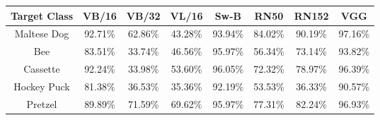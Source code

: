 \begin{table}[h!]
\begin{tabular}{|c|ccccccc|}
\hline
Target Class & VB/16 & VB/32 & VL/16 & Sw-B & RN50 & RN152 & VGG \\ \hline
Maltese Dog & 92.71\% & 62.86\% & 43.28\% & 93.94\% & 84.02\% & 90.19\% & 97.16\% \\ \hline
Bee & 83.51\% & 33.74\% & 46.56\% & 95.97\% & 56.34\% & 73.14\% & 93.82\% \\ \hline
Cassette & 92.24\% & 33.98\% & 53.60\% & 96.05\% & 72.32\% & 78.97\% & 96.39\% \\ \hline
Hockey Puck & 81.38\% & 36.53\% & 35.36\% & 92.19\% & 53.53\% & 36.33\% & 90.57\% \\ \hline
Pretzel & 89.89\% & 71.59\% & 69.62\% & 95.97\% & 77.31\% & 82.24\% & 96.93\% \\ \hline
\end{tabular}
\label{tab:table}
\end{table}
